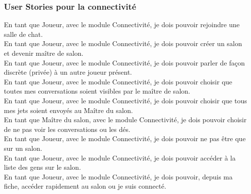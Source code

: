 \subsubsection{User Stories pour la connectivité}

En tant que Joueur, avec le module Connectivité, je dois pouvoir rejoindre une
salle de chat.\\

En tant que Joueur, avec le module Connectivité, je dois pouvoir créer un salon
et devenir maître de salon.\\

En tant que Joueur, avec le module Connectivité, je dois pouvoir parler de façon
discrète (privée) à un autre joueur présent.\\

En tant que Joueur, avec le module Connectivité, je dois pouvoir choisir que
toutes mes conversations soient visibles par le maître de salon.\\

En tant que Joueur, avec le module Connectivité, je dois pouvoir choisir que
tous mes jets soient envoyés au Maître du salon.\\


En tant que Maître du salon, avec le module Connectivité, je dois pouvoir
choisir de ne pas voir les conversations ou les dés.\\

En tant que Joueur, avec le module Connectivité, je dois pouvoir ne pas être que
sur un salon.\\

En tant que Joueur, avec le module Connectivité, je dois pouvoir accéder à la
liste des gens sur le salon.\\

En tant que Joueur, avec le module Connectivité, je dois pouvoir, depuis ma
fiche, accéder rapidement au salon ou je suis connecté.\\

